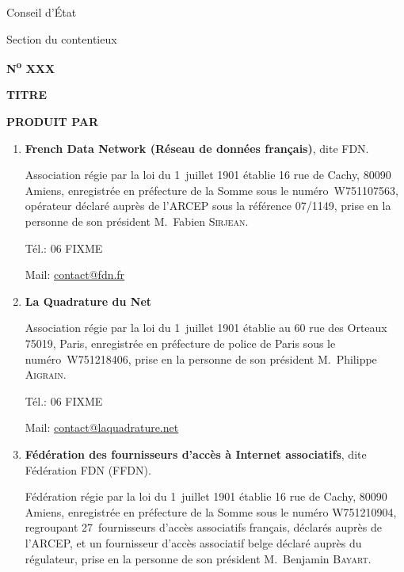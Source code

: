 \begin{titlepage}
\newenvironment{marges}[2]{
\begin{list}{}{\setlength{\leftmargin}{#1}%
\setlength{\rightmargin}{#2}}\item}
{\end{list}}

\pagestyle{empty}

\begin{marges}{-0.6in}{-0.6in}

\begin{minipage}{5cm}\centering
Conseil d'État\par
Section du contentieux\par
\textbf{N\textsuperscript{o} XXX}
\end{minipage}

\vskip 1cm

\begin{center}\LARGE\bfseries
  TITRE
\end{center}

\vskip 1cm

\textbf{PRODUIT PAR}

\begin{enumerate}
\item \textbf{French Data Network (Réseau de données français)}, dite FDN.

Association    régie par la loi du 1\ier~juillet  1901 établie 16 rue de Cachy,  80090   Amiens, enregistrée en préfecture  de la Somme sous le    numéro~W751107563, opérateur déclaré auprès de  l'ARCEP sous la    référence 07/1149, prise en la personne de son président  M.~Fabien    \textsc{Sirjean}.

Tél.: 06 FIXME

Mail: \url{contact@fdn.fr} 

\item \textbf{La Quadrature du Net}

Association    régie par la loi du 1\ier~juillet  1901 établie au 60 rue des Orteaux    75019, Paris, enregistrée en  préfecture de police de Paris sous le    numéro~W751218406, prise en la  personne de son président M.~Philippe    \textsc{Aigrain}.

Tél.: 06 FIXME

Mail:  \url{contact@laquadrature.net}

\item \textbf{Fédération des fournisseurs d'accès à Internet associatifs}, dite Fédération FDN (FFDN).

Fédération    régie par la loi du 1\ier~juillet  1901 établie 16 rue de Cachy,  80090   Amiens, enregistrée en préfecture  de la Somme sous le numéro  W751210904, regroupant 27~fournisseurs   d'accès associatifs français,   déclarés auprès de l'ARCEP, et un   fournisseur d'accès associatif  belge  déclaré auprès du régulateur,  prise  en la personne de son  président  M.~Benjamin \textsc{Bayart}.


\end{enumerate}
\end{marges}
\end{titlepage}
